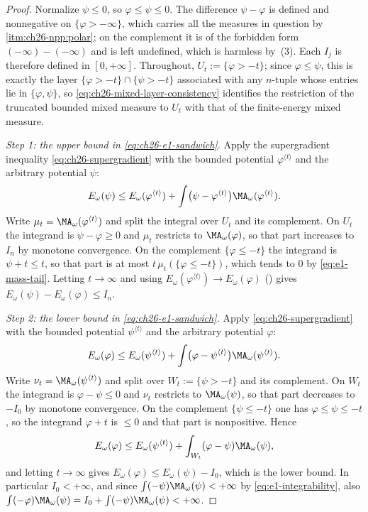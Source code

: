 \begin{proof}
Normalize \(\psi\leq0\), so \(\varphi\leq\psi\leq0\).  The difference
\(\psi-\varphi\) is defined and nonnegative on
\(\{\varphi>-\infty\}\), which carries all the measures in question by
\,\cref{itm:ch26-npp:polar}; on the complement it is
of the forbidden form \((-\infty)-(-\infty)\) and is left undefined, which is
harmless by \,(3).  Each \(I_j\) is therefore
defined in \([0,+\infty]\).  Throughout, \(U_t:=\{\varphi>-t\}\); since
\(\varphi\leq\psi\), this is exactly the layer
\(\{\varphi>-t\}\cap\{\psi>-t\}\) associated with any \(n\)-tuple whose
entries lie in \(\{\varphi,\psi\}\), so
\eqref{eq:ch26-mixed-layer-consistency} identifies the restriction of the
truncated bounded mixed measure to \(U_t\) with that of the finite-energy
mixed measure.

\emph{Step 1: the upper bound in \eqref{eq:ch26-e1-sandwich}.}  Apply the
supergradient inequality \eqref{eq:ch26-supergradient} with the bounded
potential \(\varphi^{\langle t\rangle}\) and the arbitrary potential
\(\psi\):
\[
 E_\omega(\psi)
 \leq E_\omega(\varphi^{\langle t\rangle})
   +\int\bigl(\psi-\varphi^{\langle t\rangle}\bigr)
     \MA_\omega(\varphi^{\langle t\rangle}).
\]
Write \(\mu_t=\MA_\omega(\varphi^{\langle t\rangle})\) and split the integral
over \(U_t\) and its complement.  On \(U_t\) the integrand is
\(\psi-\varphi\geq0\) and \(\mu_t\) restricts to \(\MA_\omega(\varphi)\), so
that part increases to \(I_n\) by monotone convergence.  On the complement
\(\{\varphi\leq-t\}\) the integrand is \(\psi+t\leq t\), so that part is at
most \(t\,\mu_t(\{\varphi\leq-t\})\), which tends to \(0\) by
\eqref{eq:e1-mass-tail}.  Letting \(t\to\infty\) and using
\(E_\omega(\varphi^{\langle t\rangle})\to E_\omega(\varphi)\)
() gives
\(E_\omega(\psi)-E_\omega(\varphi)\leq I_n\).

\emph{Step 2: the lower bound in \eqref{eq:ch26-e1-sandwich}.}  Apply
\eqref{eq:ch26-supergradient} with the bounded potential
\(\psi^{\langle t\rangle}\) and the arbitrary potential \(\varphi\):
\[
 E_\omega(\varphi)
 \leq E_\omega(\psi^{\langle t\rangle})
   +\int\bigl(\varphi-\psi^{\langle t\rangle}\bigr)
     \MA_\omega(\psi^{\langle t\rangle}).
\]
Write \(\nu_t=\MA_\omega(\psi^{\langle t\rangle})\) and split over
\(W_t:=\{\psi>-t\}\) and its complement.  On \(W_t\) the integrand is
\(\varphi-\psi\leq0\) and \(\nu_t\) restricts to \(\MA_\omega(\psi)\), so that
part decreases to \(-I_0\) by monotone convergence.  On the complement
\(\{\psi\leq-t\}\) one has \(\varphi\leq\psi\leq-t\), so the integrand
\(\varphi+t\) is \(\leq0\) and that part is nonpositive.  Hence
\[
 E_\omega(\varphi)\leq E_\omega(\psi^{\langle t\rangle})
   +\int_{W_t}(\varphi-\psi)\MA_\omega(\psi),
\]
and letting \(t\to\infty\) gives
\(E_\omega(\varphi)\leq E_\omega(\psi)-I_0\), which is the lower bound.  In
particular \(I_0<+\infty\), and since
\(\int(-\psi)\MA_\omega(\psi)<+\infty\) by
\eqref{eq:e1-integrability}, also
\(\int(-\varphi)\MA_\omega(\psi)=I_0+\int(-\psi)\MA_\omega(\psi)<+\infty\).


\end{proof}
